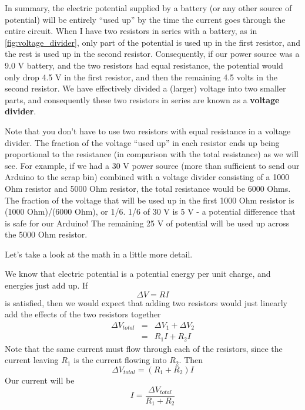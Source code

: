 In summary, the electric potential supplied by a battery (or any other source
of potential) will be entirely ``used up'' by the time the current goes through 
the entire circuit. When I have two resistors in series with a battery, as in 
\ref{fig:voltage_divider}, only part of the potential is used up in the first 
resistor, and the rest is used up in the second resistor. Consequently, if our
power source was a 9.0 V battery, and the two resistors had equal resistance, 
the potential would only drop 4.5 V in the first resistor, and then the 
remaining 4.5 volts in the second resistor. We have effectively divided a 
(larger) voltage into two smaller parts, and consequently these two 
resistors in series are known as a \textbf{voltage divider}.

Note that you don't have to use two resistors with equal resistance in a 
voltage divider. The fraction of the voltage ``used up'' in each resistor 
ends up being proportional to the resistance (in comparison with the total
resistance) as we will see. For example, if we had a 30 V power source (more 
than sufficient to send our Arduino to the scrap bin) combined with a 
voltage divider consisting of a 1000 Ohm resistor and 5000 Ohm resistor,
the total resistance would be 6000 Ohms. The fraction of the voltage that 
will be used up in the first 1000 Ohm resistor is (1000 Ohm)/(6000 Ohm), or
1/6. 1/6 of 30 V is 5 V - a potential difference that is safe for our Arduino!
The remaining 25 V of potential will be used up across the 5000 Ohm resistor.

Let's take a look at the math in a little more detail.

We know that electric potential
is a potential energy per unit charge, and energies just add up. If 
\begin{equation*}
\Delta V=RI
\end{equation*}%
is satisfied, then we would expect that adding two resistors would just
linearly add the effects of the two resistors together%
\begin{eqnarray*}
\Delta V_{total} &=&\Delta V_{1}+\Delta V_{2} \\
&=&R_{1}I+R_{2}I
\end{eqnarray*}%
Note that the same current must flow through each of the resistors, since
the current leaving $R_{1}$ is the current flowing into $R_{2}.$ Then 
\begin{equation*}
\Delta V_{total}=\left( R_{1}+R_{2}\right) I
\end{equation*}%
Our current will be 
\begin{equation*}
I=\frac{\Delta V_{total}}{R_{1}+R_{2}}
\end{equation*}

